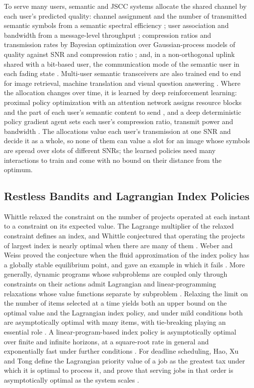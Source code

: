 To serve many users, semantic and JSCC systems allocate the shared channel by each user's
predicted quality: channel assignment and the number of transmitted semantic symbols from a
semantic spectral efficiency \cite{Yan22}; user association and bandwidth from a message-level
throughput \cite{Xia24}; compression ratios and transmission rates by Bayesian optimization over
Gaussian-process models of quality against SNR and compression ratio \cite{Hou26}; and, in a
non-orthogonal uplink shared with a bit-based user, the communication mode of the semantic user
in each fading state \cite{Mu23}. Multi-user semantic transceivers are also trained end to end for
image retrieval, machine translation and visual question answering \cite{Xie22}. Where the
allocation changes over time, it is learned by deep reinforcement learning: proximal policy
optimization with an attention network assigns resource blocks and the part of each user's
semantic content to send \cite{Wang22}, and a deep deterministic policy gradient agent sets each
user's compression ratio, transmit power and bandwidth \cite{Zhang23t}. The allocations value
each user's transmission at one SNR and decide it as a whole, so none of them can value a slot
for an image whose symbols are spread over slots of different SNRs; the learned policies need
many interactions to train and come with no bound on their distance from the optimum.

\subsection{Restless Bandits and Lagrangian Index Policies}
\label{sec:related-rmab}

Whittle relaxed the constraint on the number of projects operated at each instant to a
constraint on its expected value. The Lagrange multiplier of the relaxed constraint defines an
index, and Whittle conjectured that operating the projects of largest index is nearly optimal
when there are many of them \cite{Whittle88}. Weber and Weiss proved the conjecture when the
fluid approximation of the index policy has a globally stable equilibrium point, and gave an
example in which it fails \cite{WeberWeiss90}. More generally, dynamic programs whose subproblems
are coupled only through constraints on their actions admit Lagrangian and linear-programming
relaxations whose value functions separate by subproblem \cite{Adelman08}. Relaxing the limit on
the number of items selected at a time yields both an upper bound on the optimal value and the
Lagrangian index policy, and under mild conditions both are asymptotically optimal with many
items, with tie-breaking playing an essential role \cite{Brown20}. A linear-program-based index
policy is asymptotically optimal over finite and infinite horizons, at a square-root rate in
general and exponentially fast under further conditions \cite{Gast24}. For deadline scheduling,
Hao, Xu and Tong define the Lagrangian priority value of a job as the greatest tax under which
it is optimal to process it, and prove that serving jobs in that order is asymptotically optimal
as the system scales \cite{Hao22}.

